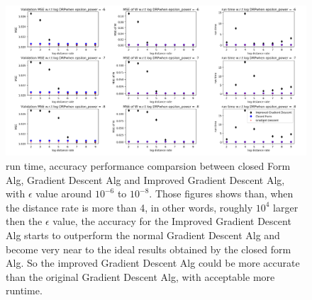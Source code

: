 \documentclass[letterpaper, 11pt]{article}
\begin{document}
\begin{figure}[!ht]
  \includegraphics[width=\linewidth]{fig/figure_cf_vs_2_gd_revised.png}
  \caption{run time, accuracy performance comparsion between closed Form Alg, Gradient Descent Alg and Improved Gradient Descent Alg, with $\epsilon$ value around $10^{-6}$ to $10^{-8}$. Those figures shows than, when the distance rate is more than 4, in other words, roughly $10^{4}$ larger then the $\epsilon$ value, the accuracy for the Improved Gradient Descent Alg starts to outperform the normal Gradient Descent Alg and become very near to the ideal results obtained by the closed form Alg. So the improved Gradient Descent Alg could be more accurate than the original Gradient Descent Alg, with acceptable more runtime.}
  \label{fig:cf_vs_2gd}
\end{figure}
\end{document}
